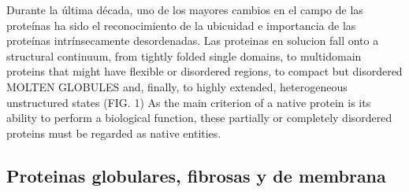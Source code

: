Durante la última década, uno de los mayores cambios en el campo de las proteínas ha sido el reconocimiento de la ubicuidad e importancia de las proteínas intrínsecamente desordenadas. 
Las proteinas en solucion fall onto a structural continuum, from tightly folded single domains, to multidomain proteins that might have flexible or disordered regions, to compact but disordered MOLTEN GLOBULES and, finally, to highly extended, heterogeneous unstructured states (FIG. 1) 
As the main criterion of a native protein is its ability to perform a biological function, these partially or completely disordered proteins must be regarded as native entities.








\subsection{Proteinas globulares, fibrosas y de membrana}




